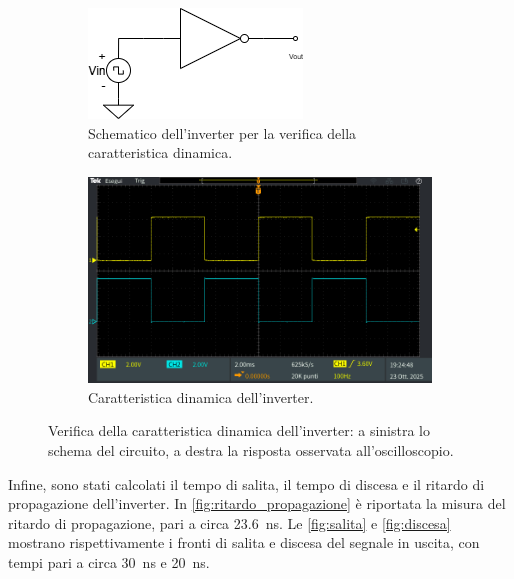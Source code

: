 \documentclass[a4paper,12pt]{article}
\begin{document}
\begin{figure}[h]
	\centering
	\begin{subfigure}[b]{0.45\textwidth}
		\centering
		\includegraphics[width=\linewidth]{immagini/inverter/circuitoLogico1NoLed.png}
		\caption{Schematico dell'inverter per la verifica della caratteristica dinamica.}
		\label{fig:inverterDinamica}
	\end{subfigure}
	\hfill
	\begin{subfigure}[b]{0.45\textwidth}
		\centering
		\includegraphics[width=\linewidth]{immagini/inverter/TEK00099.PNG}
		\caption{Caratteristica dinamica dell'inverter.}
		\label{grafico}
	\end{subfigure}
	\caption{Verifica della caratteristica dinamica dell'inverter: a sinistra lo schema del circuito, a destra la risposta osservata all'oscilloscopio.}
	\label{fig:inverterDinamica}
\end{figure}

Infine, sono stati calcolati il tempo di salita, il tempo di discesa e il ritardo di propagazione dell’inverter.
In \autoref{fig:ritardo_propagazione} è riportata la misura del ritardo di propagazione, pari a circa \SI{23.6}{\nano\second}.
Le \autoref{fig:salita} e \autoref{fig:discesa} mostrano rispettivamente i fronti di salita e discesa del segnale in uscita, con tempi pari a circa \SI{30}{\nano\second} e \SI{20}{\nano\second}.
\end{document}
